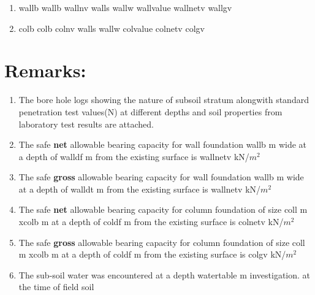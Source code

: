 \documentclass{soil12}
\begin{document}
\begin{enumerate}
\item{
{
{{wallb}}
}
{
{{wallb}}
}
{
{{wallnv}}
}
{
{{walls}}
}
{
{{wallw}}
}
{
{{wallvalue}}
}
{
{{wallnetv}}
}
{
{{wallgv}}
}
}
\item{
{
{{colb}}
}
{
{{colb}}
}
{
{{colnv}}
}
{
{{walls}}
}
{
{{wallw}}
}
{
{{colvalue}}
}
{
{{colnetv}}
}
{
{{colgv}}
}}
\end{enumerate}
\clearpage
\section{Remarks:}
\begin{enumerate}
\item{The bore hole logs showing the nature of subsoil stratum alongwith standard
penetration test values(N) at different depths and soil properties from laboratory test
results are attached.}
\item{The safe \textbf{net} allowable bearing capacity for wall foundation {{wallb}} m wide at a depth of
{{walldf}} m from the existing surface is {{wallnetv}} kN/$m^2$}
\item{The safe \textbf{gross} allowable bearing capacity for wall foundation {{wallb}} m wide at a depth of
{{walldt}} m from the existing surface is {{wallnetv}} kN/$m^2$}
\item{The safe \textbf{net} allowable bearing capacity for column foundation of size {{coll}} m x{{colb}} m at a
depth of {{coldf}} m from the existing surface is {{colnetv}} kN/$m^2$}
\item{The safe \textbf{gross} allowable bearing capacity for column foundation of size {{coll}} m x{{colb}} m
at a depth of {{coldf}} m from the existing surface is {{colgv}} kN/$m^2$}
\item{The sub-soil water was encountered at a depth {{watertable}} m investigation. at the time of field soil}

\end{enumerate}




\end{document}
